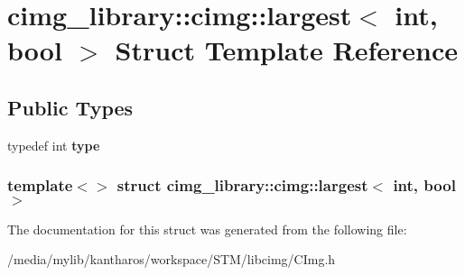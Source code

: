 \hypertarget{structcimg__library_1_1cimg_1_1largest_3_01int_00_01bool_01_4}{
\section{cimg\_\-library::cimg::largest$<$ int, bool $>$ Struct Template Reference}
\label{structcimg__library_1_1cimg_1_1largest_3_01int_00_01bool_01_4}
}
\subsection*{Public Types}
\begin{DoxyCompactItemize}
\item 
\hypertarget{structcimg__library_1_1cimg_1_1largest_3_01int_00_01bool_01_4_adb8231460cf5ba4b809fbef9e30045df}{
typedef int {\bfseries type}}
\label{structcimg__library_1_1cimg_1_1largest_3_01int_00_01bool_01_4_adb8231460cf5ba4b809fbef9e30045df}

\end{DoxyCompactItemize}
\subsubsection*{template$<$$>$ struct cimg\_\-library::cimg::largest$<$ int, bool $>$}



The documentation for this struct was generated from the following file:\begin{DoxyCompactItemize}
\item 
/media/mylib/kantharos/workspace/STM/libcimg/CImg.h\end{DoxyCompactItemize}
